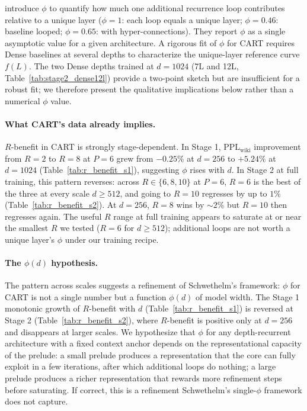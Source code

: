 \documentclass{article}
\newcommand{\cart}{\textsc{CART}}
\newcommand{\pplwiki}{PPL$_\text{wiki}$}
\begin{document}
\citet{schwethelm2026isodepth} introduce $\phi$ to quantify how much one additional recurrence loop contributes relative to a unique layer ($\phi=1$: each loop equals a unique layer; $\phi=0.46$: baseline looped; $\phi=0.65$: with hyper-connections). They report $\phi$ as a single asymptotic value for a given architecture. A rigorous fit of $\phi$ for \cart{} requires Dense baselines at several depths to characterize the unique-layer reference curve $f(L)$. The two Dense depths trained at $d{=}1024$ (7L and 12L, Table~\ref{tab:stage2_dense12l}) provide a two-point sketch but are insufficient for a robust fit; we therefore present the qualitative implications below rather than a numerical $\phi$ value.

\paragraph{What \cart{}'s data already implies.}
$R$-benefit in \cart{} is strongly stage-dependent. In Stage 1, \pplwiki{} improvement from $R{=}2$ to $R{=}8$ at $P{=}6$ grew from $-0.25\%$ at $d{=}256$ to $+5.24\%$ at $d{=}1024$ (Table~\ref{tab:r_benefit_s1}), suggesting $\phi$ rises with $d$. In Stage 2 at full training, this pattern reverses: across $R \in \{6, 8, 10\}$ at $P{=}6$, $R{=}6$ is the best of the three at every scale $d \geq 512$, and going to $R{=}10$ regresses by up to $1\%$ (Table~\ref{tab:r_benefit_s2}). At $d{=}256$, $R{=}8$ wins by $\sim 2\%$ but $R{=}10$ then regresses again. The useful $R$ range at full training appears to saturate at or near the smallest $R$ we tested ($R{=}6$ for $d \geq 512$); additional loops are not worth a unique layer's $\phi$ under our training recipe.

\paragraph{The \texorpdfstring{$\phi(d)$}{phi(d)} hypothesis.}
The pattern across scales suggests a refinement of Schwethelm's framework: $\phi$ for \cart{} is not a single number but a function $\phi(d)$ of model width. The Stage 1 monotonic growth of $R$-benefit with $d$ (Table~\ref{tab:r_benefit_s1}) is reversed at Stage 2 (Table~\ref{tab:r_benefit_s2}), where $R$-benefit is positive only at $d{=}256$ and disappears at larger scales. We hypothesize that $\phi$ for any depth-recurrent architecture with a fixed context anchor depends on the representational capacity of the prelude: a small prelude produces a representation that the core can fully exploit in a few iterations, after which additional loops do nothing; a large prelude produces a richer representation that rewards more refinement steps before saturating. If correct, this is a refinement Schwethelm's single-$\phi$ framework does not capture.
\end{document}
